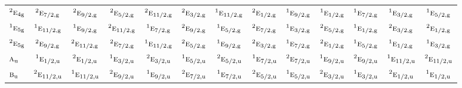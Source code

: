 \documentclass[10pt,a4paper]{article}
\numberwithin{equation}{section}
\newcommand{\irr}[1]{\text{\normalfont\scshape #1}}
\newcommand{\conjpair}[1]{{}^{#1}}
\newcommand{\ptag}[1]{\mathrm{#1}}
\begin{document}
{\begin{longtable}{@{}lcccccccccccc@{}}
$\conjpair{2}\irr{e}_{4\ptag{g}}$ & $\conjpair{2}\irr{e}_{7/2,\ptag{g}}$ & $\conjpair{2}\irr{e}_{9/2,\ptag{g}}$ & $\conjpair{2}\irr{e}_{5/2,\ptag{g}}$ & $\conjpair{2}\irr{e}_{11/2,\ptag{g}}$ & $\conjpair{2}\irr{e}_{3/2,\ptag{g}}$ & $\conjpair{1}\irr{e}_{11/2,\ptag{g}}$ & $\conjpair{2}\irr{e}_{1/2,\ptag{g}}$ & $\conjpair{1}\irr{e}_{9/2,\ptag{g}}$ & $\conjpair{1}\irr{e}_{1/2,\ptag{g}}$ & $\conjpair{1}\irr{e}_{7/2,\ptag{g}}$ & $\conjpair{1}\irr{e}_{3/2,\ptag{g}}$ & $\conjpair{1}\irr{e}_{5/2,\ptag{g}}$\\
$\conjpair{1}\irr{e}_{5\ptag{g}}$ & $\conjpair{1}\irr{e}_{11/2,\ptag{g}}$ & $\conjpair{1}\irr{e}_{9/2,\ptag{g}}$ & $\conjpair{2}\irr{e}_{11/2,\ptag{g}}$ & $\conjpair{1}\irr{e}_{7/2,\ptag{g}}$ & $\conjpair{2}\irr{e}_{9/2,\ptag{g}}$ & $\conjpair{1}\irr{e}_{5/2,\ptag{g}}$ & $\conjpair{2}\irr{e}_{7/2,\ptag{g}}$ & $\conjpair{1}\irr{e}_{3/2,\ptag{g}}$ & $\conjpair{2}\irr{e}_{5/2,\ptag{g}}$ & $\conjpair{1}\irr{e}_{1/2,\ptag{g}}$ & $\conjpair{2}\irr{e}_{3/2,\ptag{g}}$ & $\conjpair{2}\irr{e}_{1/2,\ptag{g}}$\\
$\conjpair{2}\irr{e}_{5\ptag{g}}$ & $\conjpair{2}\irr{e}_{9/2,\ptag{g}}$ & $\conjpair{2}\irr{e}_{11/2,\ptag{g}}$ & $\conjpair{2}\irr{e}_{7/2,\ptag{g}}$ & $\conjpair{1}\irr{e}_{11/2,\ptag{g}}$ & $\conjpair{2}\irr{e}_{5/2,\ptag{g}}$ & $\conjpair{1}\irr{e}_{9/2,\ptag{g}}$ & $\conjpair{2}\irr{e}_{3/2,\ptag{g}}$ & $\conjpair{1}\irr{e}_{7/2,\ptag{g}}$ & $\conjpair{2}\irr{e}_{1/2,\ptag{g}}$ & $\conjpair{1}\irr{e}_{5/2,\ptag{g}}$ & $\conjpair{1}\irr{e}_{1/2,\ptag{g}}$ & $\conjpair{1}\irr{e}_{3/2,\ptag{g}}$\\
$\irr{a}_{\ptag{u}}$ & $\conjpair{1}\irr{e}_{1/2,\ptag{u}}$ & $\conjpair{2}\irr{e}_{1/2,\ptag{u}}$ & $\conjpair{1}\irr{e}_{3/2,\ptag{u}}$ & $\conjpair{2}\irr{e}_{3/2,\ptag{u}}$ & $\conjpair{1}\irr{e}_{5/2,\ptag{u}}$ & $\conjpair{2}\irr{e}_{5/2,\ptag{u}}$ & $\conjpair{1}\irr{e}_{7/2,\ptag{u}}$ & $\conjpair{2}\irr{e}_{7/2,\ptag{u}}$ & $\conjpair{1}\irr{e}_{9/2,\ptag{u}}$ & $\conjpair{2}\irr{e}_{9/2,\ptag{u}}$ & $\conjpair{1}\irr{e}_{11/2,\ptag{u}}$ & $\conjpair{2}\irr{e}_{11/2,\ptag{u}}$\\
$\irr{b}_{\ptag{u}}$ & $\conjpair{2}\irr{e}_{11/2,\ptag{u}}$ & $\conjpair{1}\irr{e}_{11/2,\ptag{u}}$ & $\conjpair{2}\irr{e}_{9/2,\ptag{u}}$ & $\conjpair{1}\irr{e}_{9/2,\ptag{u}}$ & $\conjpair{2}\irr{e}_{7/2,\ptag{u}}$ & $\conjpair{1}\irr{e}_{7/2,\ptag{u}}$ & $\conjpair{2}\irr{e}_{5/2,\ptag{u}}$ & $\conjpair{1}\irr{e}_{5/2,\ptag{u}}$ & $\conjpair{2}\irr{e}_{3/2,\ptag{u}}$ & $\conjpair{1}\irr{e}_{3/2,\ptag{u}}$ & $\conjpair{2}\irr{e}_{1/2,\ptag{u}}$ & $\conjpair{1}\irr{e}_{1/2,\ptag{u}}$\\

\end{longtable}}
\end{document}
